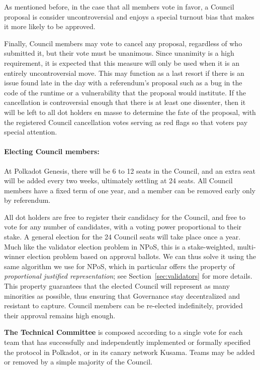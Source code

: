 As mentioned before, in the case that all members vote in favor, a Council proposal is consider uncontroversial and enjoys a special turnout bias that makes it more likely to be approved. 

Finally, Council members may vote to cancel any proposal, regardless of who submitted it, but their vote must be unanimous. Since unanimity is a high requirement, it is expected that this measure will only be used when it is an entirely uncontroversial move. This may function as a last resort if there is an issue found late in the day with a referendum's proposal such as a bug in the code of the runtime or a vulnerability  that the proposal would institute. If the cancellation is controversial enough that there is at least one dissenter, then it will be left to all dot holders en masse to determine the fate of the proposal, with the registered Council cancellation votes serving as red flags so that voters pay special attention.

\paragraph{Electing Council members:} At Polkadot Genesis, there will be 6 to 12 seats in the Council, and an extra seat will be added every two weeks, ultimately settling at 24 seats.  All Council members have a fixed term of one year, and a member can be removed early only by referendum. 

All dot holders are free to register their candidacy for the Council, and free to vote for any number of candidates, with a voting power proportional to their stake. A general election for the 24 Council seats will take place once a year. Much like the validator election problem in NPoS, this is a stake-weighted, multi-winner election problem based on approval ballots. We can thus solve it using the same algorithm we use for NPoS, which in particular offers the property of \emph{proportional justified representation}; see Section~\ref{sec:validators} for more details. This property guarantees that the elected Council will represent as many minorities as possible, thus ensuring that Governance stay decentralized and resistant to capture. Council members can be re-elected indefinitely, provided their approval remains high enough. 

\medskip

\textbf{The Technical Committee} is composed according to a single vote for each team that has successfully and independently implemented or formally specified the protocol in Polkadot, or in its canary network Kusama. Teams may be added or removed by a simple majority of the Council. 

